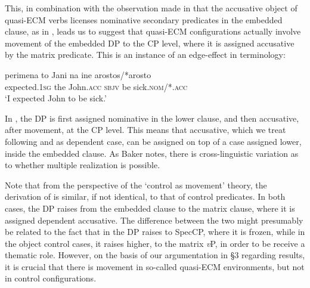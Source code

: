 \documentclass[output=paper]{langsci/langscibook}
\begin{document}
\ea%
    \label{ex:alexiadou:43}
    \z
\z

This, in combination with the observation made in \citet{Kotzoglou2007} that the accusative object of quasi-ECM verbs licenses nominative secondary predicates in the embedded clause, as in , leads us to suggest that quasi-ECM configurations actually involve movement of the embedded DP to the CP level, where it is assigned accusative by the matrix predicate. This is an instance of an edge-effect in  terminology:

\ea%
    \label{ex:alexiadou:46}
    \gll perimena        to Jani           na    ine arostos/*arosto \\
         expected{}.\textsc{1sg} the John\textsc{{}.acc} \textsc{sbjv} be sick\textsc{{}.nom}/*\textsc{{}.acc} \\
    \glt ‘I expected John to be sick.’ 
    \z


In , the DP is first assigned nominative in the lower clause, and then accusative, after movement, at the CP level. This means that accusative, which we treat following \citet{Marantz1991} and \citet{Baker2015} as dependent case, can be assigned on top of a case assigned lower, inside the embedded clause. As Baker notes, there is cross-linguistic variation as to whether multiple realization is possible. 

Note that from the perspective of the ‘control as movement’ theory, the derivation of  is similar, if not identical, to that of control predicates. In both cases, the DP raises from the embedded clause to the matrix clause, where it is assigned dependent accusative. The difference between the two might presumably be related to the fact that in  the DP raises to SpecCP, where it is frozen, while in the object control cases, it raises higher, to the matrix \textit{v}P, in order to be receive a thematic role. However, on the basis of our argumentation in §3 regarding  results, it is crucial that there is movement in so-called quasi-ECM environments, but not in control configurations. 
\end{document}

